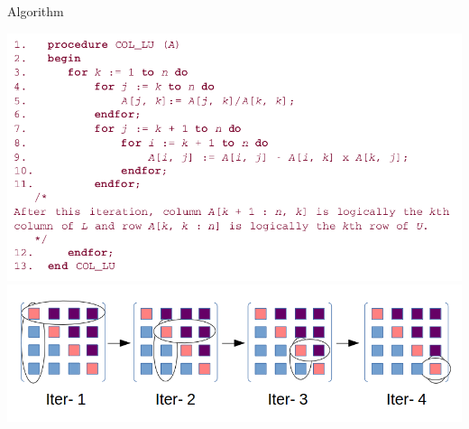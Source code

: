 \documentclass{beamer}
\begin{document}
\begin{frame}{Algorithm}
\begin{center}
\includegraphics[scale=.28]{algo.png}\\
\includegraphics[scale=.3]{pic1.png}
\end{center}
\end{frame}
\end{document}
